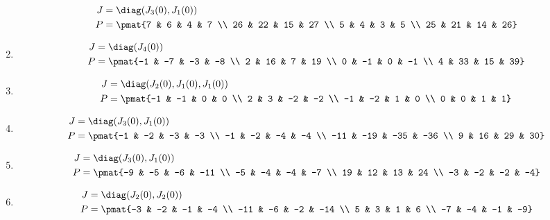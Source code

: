 \begin{enumerate}
\begin{align*}
J &= \diag(J_{3}(0), J_{1}(0))\\
P &= \pmat{7 & 6 & 4 & 7 \\ 26 & 22 & 15 & 27 \\ 5 & 4 & 3 & 5 \\ 25 & 21 & 14 & 26}
\end{align*}

\item

\begin{align*}
J &= \diag(J_{4}(0))\\
P &= \pmat{-1 & -7 & -3 & -8 \\ 2 & 16 & 7 & 19 \\ 0 & -1 & 0 & -1 \\ 4 & 33 & 15 & 39}
\end{align*}

\item

\begin{align*}
J &= \diag(J_{2}(0), J_{1}(0), J_{1}(0))\\
P &= \pmat{-1 & -1 & 0 & 0 \\ 2 & 3 & -2 & -2 \\ -1 & -2 & 1 & 0 \\ 0 & 0 & 1 & 1}
\end{align*}

\item

\begin{align*}
J &= \diag(J_{3}(0), J_{1}(0))\\
P &= \pmat{-1 & -2 & -3 & -3 \\ -1 & -2 & -4 & -4 \\ -11 & -19 & -35 & -36 \\ 9 & 16 & 29 & 30}
\end{align*}

\item

\begin{align*}
J &= \diag(J_{3}(0), J_{1}(0))\\
P &= \pmat{-9 & -5 & -6 & -11 \\ -5 & -4 & -4 & -7 \\ 19 & 12 & 13 & 24 \\ -3 & -2 & -2 & -4}
\end{align*}

\item

\begin{align*}
J &= \diag(J_{2}(0), J_{2}(0))\\
P &= \pmat{-3 & -2 & -1 & -4 \\ -11 & -6 & -2 & -14 \\ 5 & 3 & 1 & 6 \\ -7 & -4 & -1 & -9}
\end{align*}


\end{enumerate}
